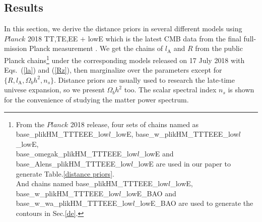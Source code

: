 \documentclass[floatfix,aps,amsmath,nofootinbib,onecolumn,10pt]{revtex4}
\begin{document}
\subsection{Results}
\label{results}

In this section, we derive the distance priors in several different models using $Planck$ 2018 TT,TE,EE $+$ lowE which is the latest CMB data from the final full-mission Planck  measurement \cite{Aghanim:2018eyx}. We get the chains of $ l_\textrm{A}$ and $R$ from the public Planck chains\footnote{From the $Planck$ 2018 release, four sets of chains named as 
base\_plikHM\_TTTEEE\_low$l$\_lowE, base\_w\_plikHM\_TTTEEE\_low$l$\_lowE, \\
base\_omegak\_plikHM\_TTTEEE\_low$l$\_lowE and base\_Alens\_plikHM\_TTTEEE\_low$l$\_lowE are used in our paper to generate Table.\ref{distance priors}. \\
 And chains named  
base\_plikHM\_TTTEEE\_low$l$\_lowE, base\_w\_plikHM\_TTTEEE\_low$l$\_lowE\_BAO and \\
base\_w\_wa\_plikHM\_TTTEEE\_low$l$\_lowE\_BAO are used to generate the contours in Sec.\ref{de}.} under the corresponding models released on 17 July 2018 with Eqs.~(\ref{la}) and (\ref{Rz}), then marginalize over the parameters except for $\{R, l_\textrm{A}, \Omega_b h^2, n_s\}$. Distance priors are usually used to research the late-time univese expansion, so we present $\Omega_b h^2$ too. The scalar spectral index $n_s$ is shown for the convenience of studying the matter power spectrum.
\end{document}
